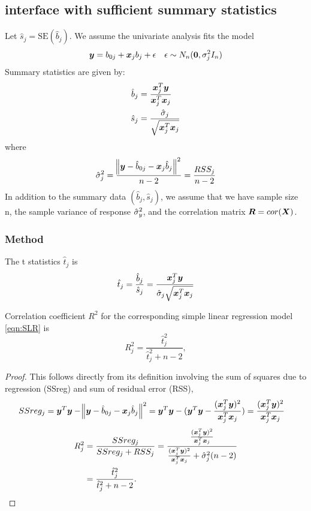 \subsection{\susie interface with sufficient summary statistics}
Let $\hat{s}_j = \text{SE}(\hat{b}_j)$. We assume the univariate analysis fits the model
\begin{equation}\label{eqn:SLR}
    \bm y = b_{0j} + \bm x_j b_j + \epsilon \quad \epsilon\sim N_n(\bm{0}, \sigma_j^2 I_n)
\end{equation}
Summary statistics are given by:
\begin{align}
    \hat{b}_{j} &= \frac{\bm x_{j}^{T}\bm y}{\bm x_{j}^{T}\bm x_{j}} \\
    \hat{s}_{j} &= \frac{\hat{\sigma}_{j}}{\sqrt{\bm x_{j}^{T}\bm x_{j}}} \label{eqn:shat}
\end{align}
where
\begin{equation}
    \hat{\sigma}_{j}^{2} = \frac{\norm{\bm y - \hat{b}_{0j} - \bm x_{j} \hat{b}_{j}}^2}{n-2} = \frac{RSS_{j}}{n-2}
\end{equation}
In addition to the summary data $(\hat{b}_j, \hat{s}_j)$, we assume that we have sample size n, the sample variance of response $\hat{\sigma}_y^2$, and the correlation matrix $\bm R = cor(\bm X)$.

\subsubsection{Method}

The t statistics $\hat{t}_j$ is
\begin{equation}\label{eqn: ss t}
     \hat{t}_{j} = \frac{\hat{b}_{j}}{\hat{s}_{j}} = \frac{\bm x_{j}^{T}\bm y}{\hat{\sigma}_{j}\sqrt{\bm x_{j}^{T}\bm x_{j}}}
\end{equation}
\begin{proposition} \label{prop:Cor Coeff}
Correlation coefficient $R^2$ for the corresponding simple linear regression model \eqref{eqn:SLR} is
\begin{equation}
    R_{j}^2 = \frac{\hat{t}_{j}^2}{\hat{t}_{j}^2+n-2},
\end{equation}
\end{proposition}

\begin{proof}
This follows directly from its definition involving the sum of squares due to regression (SSreg) and sum of residual error (RSS),
\begin{align}
    SSreg_j &= \bm y^T \bm y - \norm{\bm y - \hat{b}_{0j} - \bm x_{j} \hat{b}_{j}}^2 = \bm y^T \bm y - (\bm y^T \bm y - \frac{(\bm x_{j}^{T}\bm y)^2}{\bm x_{j}^{T}\bm x_{j}}) = \frac{(\bm x_{j}^{T}\bm y)^2}{\bm x_{j}^{T}\bm x_{j}}
\end{align}
\begin{align}
    R_{j}^2 &= \frac{SSreg_j}{SSreg_j + RSS_j} = \frac{\frac{(\bm x_{j}^{T}\bm y)^2}{\bm x_{j}^{T}\bm x_{j}}}{\frac{(\bm x_{j}^{T}\bm y)^2}{\bm x_{j}^{T}\bm x_{j}} + \hat{\sigma}_{j}^{2}(n-2)} \\
    &= \frac{\hat{t}_{j}^2}{\hat{t}_{j}^2+n-2}.
\end{align}
\end{proof}

